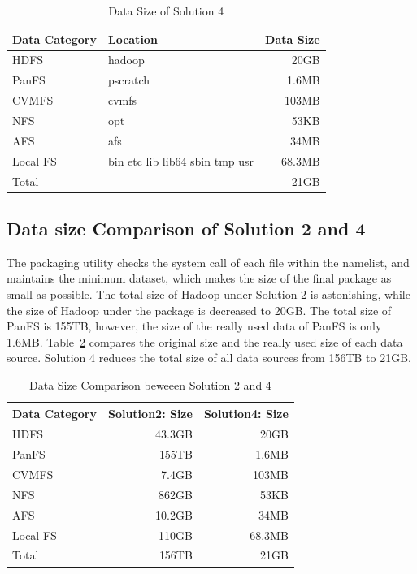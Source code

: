 \documentclass{acm_proc_article-sp}
\begin{document}
\begin{table}
    \centering
    \begin{tabular}{|l|l|r|}
    \hline
    Data Category &Location & Data Size \\ \hline
    HDFS & hadoop &20GB \\ \hline
    PanFS & pscratch & 1.6MB \\ \hline
    CVMFS & cvmfs &103MB \\ \hline 
    NFS & opt &53KB \\ \hline
    AFS & afs &34MB \\ \hline
    Local FS& bin etc lib lib64 sbin tmp usr&68.3MB \\ \hline
    Total & &21GB \\ \hline
    \end{tabular}
    \caption{Data Size of Solution 4}
    \label{table:datasize-3rd}
\end{table}    

\subsection{ Data size Comparison of Solution 2 and 4}

The packaging utility checks the system call of each file within the namelist,
and maintains the minimum dataset, which makes the size of the final package 
as small as possible. The total size of Hadoop under Solution 2 is astonishing,
while the size of Hadoop under the package is decreased to 20GB. 
The total size of PanFS is 155TB, however, the size of the really used data of PanFS is only 1.6MB.
Table~\ref{table:datasize-2nd3rd} compares the original size and the really used size of each data source.
Solution 4 reduces the total size of all data sources from 156TB to 21GB.

\begin{table}
    \centering
    \begin{tabular}{|l|r|r|}
    \hline
     Data Category & Solution2: Size & Solution4: Size \\ \hline
    HDFS & 43.3GB & 20GB \\ \hline
    PanFS & 155TB & 1.6MB \\ \hline
    CVMFS & 7.4GB &103MB \\ \hline
    NFS & 862GB &53KB \\ \hline
    AFS & 10.2GB &34MB \\ \hline
    Local FS& 110GB&68.3MB \\ \hline
    Total & 156TB &21GB \\ \hline
    \end{tabular}
    \caption{Data Size Comparison beweeen Solution 2 and 4}
    \label{table:datasize-2nd3rd}
\end{table}
\end{document}
